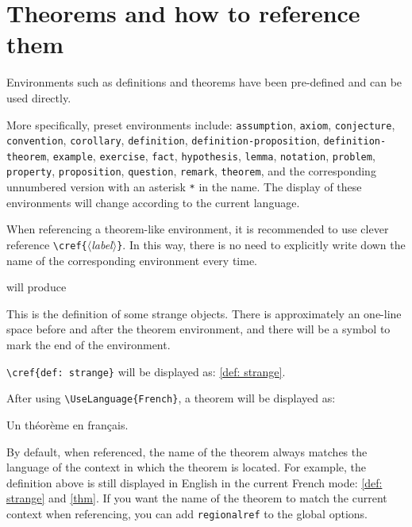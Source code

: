 \documentclass{simplivre}
\providecommand{\meta}[1]{$\langle${\normalfont\itshape#1}$\rangle$}
\newenvironment{remind}[1][Remind]{%
    \LocallyStopLineNumbers%
    \begin{tcolorbox}[breakable,
        enhanced,
        width = \textwidth,
        colback = white, colbacktitle = paper,
        colframe = gray!50, boxrule=0.2mm,
        coltitle = black,
        fonttitle = \sffamily,
        attach boxed title to top left = {yshift=-\tcboxedtitleheight/2,  xshift=\tcboxedtitlewidth/4},
        boxed title style = {boxrule=0pt, colframe=paper},
        before skip = 0.3cm,
        after skip = 0.3cm,
        top = 3mm,
        bottom = 3mm,
        title={\sffamily #1}]%
}{\end{tcolorbox}\ResumeLineNumbers}
\begin{document}
\section{Theorems and how to reference them}

Environments such as definitions and theorems have been pre-defined and can be used directly. 

More specifically, preset environments include: 
\texttt{assumption}, \texttt{axiom}, \texttt{conjecture}, \texttt{convention}, \texttt{corollary}, \texttt{definition}, \texttt{definition-proposition}, \texttt{definition-theorem}, \texttt{example}, \texttt{exercise}, \texttt{fact}, \texttt{hypothesis}, \texttt{lemma}, \texttt{notation}, \texttt{problem}, \texttt{property}, \texttt{proposition}, \texttt{question}, \texttt{remark}, \texttt{theorem}, and the corresponding unnumbered version with an asterisk \lstinline|*| in the name. The display of these environments will change according to the current language.

When referencing a theorem-like environment, it is recommended to use clever reference \lstinline|\cref{|\meta{label}\texttt{\}}. In this way, there is no need to explicitly write down the name of the corresponding environment every time.

\begin{remind}[Example]

\lstinline|\cref{def: strange}| will be displayed as: \cref{def: strange}.

After using \lstinline|\UseLanguage{French}|, a theorem will be displayed as:

\begin{theorem}[Inutile]\label{thm}
    Un théorème en français.
\end{theorem}

By default, when referenced, the name of the theorem always matches the language of the context in which the theorem is located. For example, the definition above is still displayed in English in the current French mode: \cref{def: strange} and \cref{thm}. If you want the name of the theorem to match the current context when referencing, you can add \texttt{regionalref} to the global options.
\end{remind}
\end{document}
